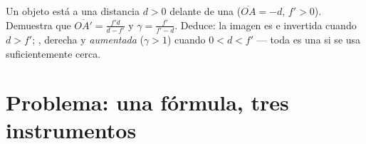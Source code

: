 \begin{exercise}[$\star\star\star$]\label{exo:g11:lenses-and-eye:15}
Un objeto  está a una distancia $d > 0$ delante de una  ($\overline{OA} = -d$, $f' > 0$). Demuestra que
$\overline{OA'} = \frac{f'd}{d - f'}$ y
$\gamma = \frac{f'}{f' - d}$. Deduce: la imagen es  e invertida
cuando $d > f'$; , derecha y \emph{aumentada} ($\gamma > 1$)
cuando $0 < d < f'$ --- toda  es una  si se usa
suficientemente cerca.
\end{exercise}

\section{Problema: una fórmula, tres instrumentos}

